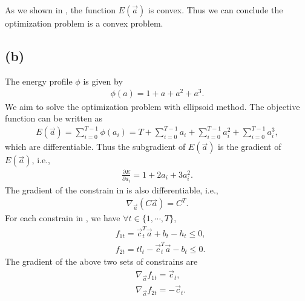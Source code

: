 \documentclass[letterpaper,11pt]{article}
\begin{document}
As we shown in , the function $E(\vec a)$ is convex.
Thus we can conclude the optimization problem is a convex problem.

\subsection*{(b)}

The energy profile $\phi$ is given by
\begin{align}
    \phi(a)=1+a+a^2+a^3.
\end{align}
We aim to solve the optimization problem with ellipsoid method.
The objective function can be written as
\begin{align}
    E(\vec a)=\sum_{i=0}^{T-1} \phi(a_i)=T+\sum_{i=0}^{T-1} a_i + \sum_{i=0}^{T-1} a_i^2 + \sum_{i=0}^{T-1} a_i^3,
\end{align}
which are differentiable.
Thus the subgradient of $E(\vec a)$ is the gradient of $E(\vec a)$, i.e.,
\begin{align}
    \frac{\partial E}{\partial a_i} = 1 + 2a_i + 3a_i^2.
\end{align}
The gradient of the constrain in  is also differentiable, i.e.,
\begin{align}
    \nabla_{\vec a} (C \vec a) = C^T.
\end{align}
For each constrain in , we have $\forall t\in \{1,\cdots,T\}$,
\begin{align}
    &f_{1t}=\vec c_t^T \vec a + b_t -h_t\le 0,\\
    &f_{2t}=tl_t - \vec c_t^T \vec a - b_t\le 0.
\end{align}
The gradient of the above two sets of constrains are
\begin{align}
    &\nabla_{\vec a} f_{1t}=\vec c_t,\\
    &\nabla_{\vec a} f_{2t}=-\vec c_t.
\end{align}
\end{document}
